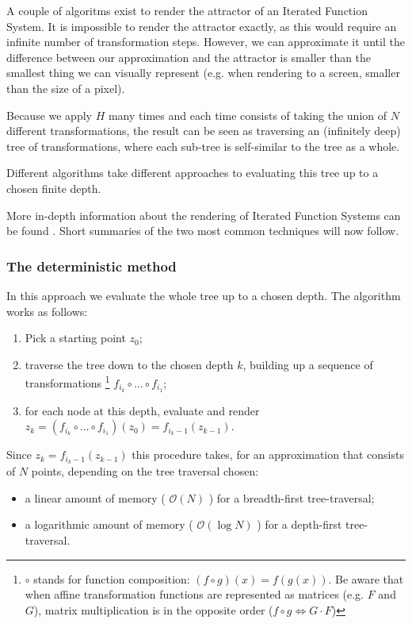 \documentclass[11pt]{article}
\begin{document}
A couple of algoritms exist to render the attractor of an Iterated Function System. 
It is impossible to render the attractor exactly, as this would require an infinite number of transformation steps.
However, we can approximate it until the difference between our approximation and the attractor is smaller than
the smallest thing we can visually represent (e.g. when rendering to a screen, smaller than the size of a pixel).

Because we apply \(H\) many times and each time consists of taking the union of \(N\) different transformations,
the result can be seen as traversing an (infinitely deep) tree of transformations, 
where each sub-tree is self-similar to the tree as a whole.

Different algorithms take different approaches to evaluating this tree up to a chosen finite depth.

More in-depth information about the rendering of Iterated Function Systems can be found \cite{hepting1991rendering}. 
Short summaries of the two most common techniques will now follow.

\subsubsection{The deterministic method}
\label{sec:org6492fc1}

In this approach we evaluate the whole tree up to a chosen depth. The algorithm works as follows:

\begin{enumerate}
\item Pick a starting point \(z_0\);
\item traverse the tree down to the chosen depth \(k\), building up a sequence of transformations \footnote{\(\circ\) stands for function composition: \((f \circ g)(x) = f(g(x))\). 
Be aware that when affine transformation functions are represented as matrices (e.g. \(F\) and \(G\)), matrix multiplication is in the opposite order (\(f \circ g \Leftrightarrow G \cdot F\))}
\(f_{i_k} \circ \ldots \circ f_{i_1}\);
\item for each node at this depth, evaluate and render \(z_k = (f_{i_k} \circ \ldots \circ f_{i_1})(z_0) = f_{i_k-1}(z_{k-1})\).
\end{enumerate}

Since \(z_{k} = f_{i_k-1}(z_{k-1})\) this procedure takes, for an approximation that consists of \(N\) points, depending on the tree traversal chosen:

\begin{itemize}
\item a linear amount of memory ( \(\mathcal{O}(N)\) ) for a breadth-first tree-traversal;
\item a logarithmic amount of memory ( \(\mathcal{O}(\log{N})\) ) for a depth-first tree-traversal.
\end{itemize}
\end{document}
